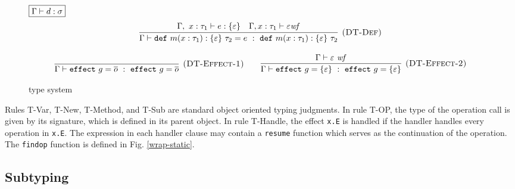 \documentclass{article}
\theoremstyle{definition}
\newcommand{\keywadj}[1]{\mathtt{#1}}
\newcommand{\keyw}[1]{\keywadj{#1}~}
\begin{document}
\begin{figure}[H]
{\noindent$\fbox{$\Gamma \vdash d : \sigma$}$
\[
\begin{array}{c}
\infer[\textsc{(DT-Def)}]
  {\Gamma \vdash \keyw{def} m(x : \tau_1) : \{ \varepsilon \}~\tau_2 = e~:~\keyw{def} m(x : \tau_1) : \{ \varepsilon \}~\tau_2}
  { \Gamma,~x : \tau_1 \vdash e : \{ \varepsilon \} & \Gamma, x : \tau_1 \vdash \varepsilon \mathit{wf}  }\\[3ex]

\infer[\textsc{(DT-Effect-1)}]
  {\Gamma \vdash \keyw{effect} g = \overline{o} ~:~\keyw{effect} g =  \overline{o} }
  {} \quad \quad 
  
  
\infer[\textsc{(DT-Effect-2)}]
  {\Gamma \vdash \keyw{effect} g = \{ \varepsilon \}~:~\keyw{effect} g = \{ \varepsilon \}}
  {\Gamma \vdash \varepsilon~\mathit{wf}}
 
\end{array}
\]

}
\caption{ type system}
\label{f-declarative}
\end{figure}


Rules T-Var, T-New, T-Method, and T-Sub are standard object oriented typing judgments.  In rule T-OP, the type of the operation call is given by its signature, which is defined in its parent object. In rule T-Handle, the effect \texttt{x.E} is handled if the handler handles every operation in \texttt{x.E}. The expression in each handler clause may contain a \texttt{resume} function which serves as the continuation of the operation.  The \texttt{findop} function is defined in Fig. \ref{wrap-static}.



\subsection{Subtyping} 
\end{document}
